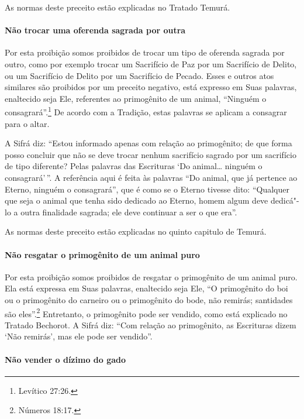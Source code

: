 \begin{multicols}{2}
As normas deste preceito estão explicadas no Tratado Temurá\starr.

\paragraph{Não trocar uma oferenda sagrada por outra}

Por esta proibição somos proibidos de trocar um tipo de oferenda sagrada
por outro, como por exemplo trocar um Sacrifício de Paz por um
Sacrifício de Delito, ou um Sacrifício de Delito por um Sacrifício de
Pecado. Esses e outros atos similares são proibidos por um preceito
negativo, está expresso em Suas palavras, enaltecido seja Ele,
referentes ao primogênito de um animal, ``Ninguém o consagrará''.\footnote{Levítico 27:26.} De acordo com a Tradição, estas palavras se aplicam a
consagrar para o altar.

A Sifrá\starr{} diz: ``Estou informado apenas com relação ao primogênito; de que
forma posso concluir que não se deve trocar nenhum sacrifício sagrado
por um sacrifício de tipo diferente? Pelas palavras das Escrituras `Do
animal\ldots{} ninguém o consagrará'\,''. A referência aqui é feita às
palavras ``Do animal, que já pertence ao Eterno, ninguém o consagrará'',
que é como se o Eterno tivesse dito: ``Qualquer que seja o animal que
tenha sido dedicado ao Eterno, homem algum deve dedicá"-lo a outra
finalidade sagrada; ele deve continuar a ser o que era''.

As normas deste preceito estão explicadas no quinto capitulo de Temurá\starr.

\paragraph{Não resgatar o primogênito de um animal puro}

Por esta proibição somos proibidos de resgatar o primogênito de um
animal puro. Ela está expressa em Suas palavras, enaltecido seja Ele,
``O primogênito do boi ou o primogênito do carneiro ou o primogênito do
bode, não remirás; santidades são eles''.\footnote{Números 18:17.} Entretanto, o
primogênito pode ser vendido, como está explicado no Tratado Bechorot\starr. A
Sifrá\starr{} diz: ``Com relação ao primogênito, as Escrituras dizem `Não
remirás', mas ele pode ser vendido''.

\paragraph{Não vender o dízimo do gado}


\end{multicols}

